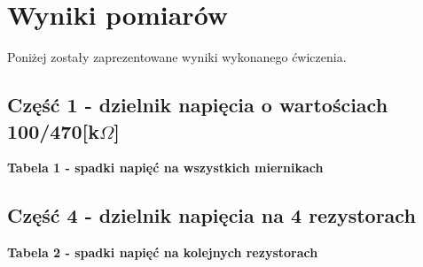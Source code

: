 \documentclass[11pt]{article}
\begin{document}
    \section{Wyniki pomiarów}
    \par{
        Poniżej zostały zaprezentowane wyniki wykonanego ćwiczenia.
    }
    \subsection{Część 1 - dzielnik napięcia o wartościach 100/470[k$\Omega$]}
    \begin{center}
        \small{\textbf{Tabela 1 - spadki napięć na wszystkich miernikach}}
    \end{center}
    \begin{center}
    \end{center}

    \subsection{Część 4 - dzielnik napięcia na 4 rezystorach}
    \begin{center}
        \small{\textbf{Tabela 2 - spadki napięć na kolejnych rezystorach}}
    \end{center}
    \begin{center}
    \end{center}
\end{document}
